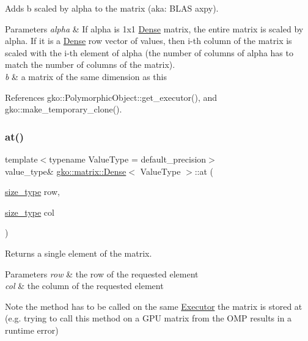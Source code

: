 Adds {\ttfamily b} scaled by {\ttfamily alpha} to the matrix (aka\+: B\+L\+AS axpy). 


\begin{DoxyParams}{Parameters}
{\em alpha} & If alpha is 1x1 \hyperlink{classgko_1_1matrix_1_1Dense}{Dense} matrix, the entire matrix is scaled by alpha. If it is a \hyperlink{classgko_1_1matrix_1_1Dense}{Dense} row vector of values, then i-\/th column of the matrix is scaled with the i-\/th element of alpha (the number of columns of alpha has to match the number of columns of the matrix). \\
\hline
{\em b} & a matrix of the same dimension as this \\
\hline
\end{DoxyParams}


References gko\+::\+Polymorphic\+Object\+::get\+\_\+executor(), and gko\+::make\+\_\+temporary\+\_\+clone().

\mbox{\label{classgko_1_1matrix_1_1Dense_af0f1af68853537807ca271a296de3cd0}} 
\subsubsection{\texorpdfstring{at()}{at()}\hspace{0.1cm}{\footnotesize\ttfamily [1/4]}}
{\footnotesize\ttfamily template$<$typename Value\+Type = default\+\_\+precision$>$ \\
value\+\_\+type\& \hyperlink{classgko_1_1matrix_1_1Dense}{gko\+::matrix\+::\+Dense}$<$ Value\+Type $>$\+::at (\begin{DoxyParamCaption}\item[{\hyperlink{namespacegko_a6e5c95df0ae4e47aab2f604a22d98ee7}{size\+\_\+type}}]{row,  }\item[{\hyperlink{namespacegko_a6e5c95df0ae4e47aab2f604a22d98ee7}{size\+\_\+type}}]{col }\end{DoxyParamCaption})\hspace{0.3cm}{\ttfamily [noexcept]}}



Returns a single element of the matrix. 


\begin{DoxyParams}{Parameters}
{\em row} & the row of the requested element \\
\hline
{\em col} & the column of the requested element\\
\hline
\end{DoxyParams}
\begin{DoxyNote}{Note}
the method has to be called on the same \hyperlink{classgko_1_1Executor}{Executor} the matrix is stored at (e.\+g. trying to call this method on a G\+PU matrix from the O\+MP results in a runtime error) 
\end{DoxyNote}


